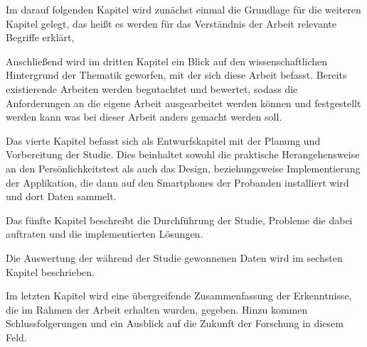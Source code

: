 Im darauf folgenden Kapitel wird zunächst einmal die Grundlage für die weiteren Kapitel gelegt, das heißt
es werden für das Verständnis der Arbeit relevante Begriffe erklärt, 
\par


Anschließend wird im dritten Kapitel ein Blick auf den wissenschaftlichen Hintergrund der Thematik geworfen, mit der sich diese Arbeit befasst.
Bereits existierende Arbeiten werden begutachtet und bewertet, sodass die Anforderungen an die eigene Arbeit ausgearbeitet werden können und festgestellt werden kann was bei dieser Arbeit anders gemacht werden soll.
\par

Das vierte Kapitel befasst sich als Entwurfskapitel mit der Planung und Vorbereitung der Studie.
Dies beinhaltet sowohl die praktische Herangehensweise an den Persönlichkeitstest als auch das Design, beziehungsweise Implementierung der Applikation,
die dann auf den Smartphones der Probanden installiert wird und dort Daten sammelt. 

Das fünfte Kapitel beschreibt die Durchführung der Studie, Probleme die dabei auftraten und die implementierten Lösungen.

Die Auswertung der während der Studie gewonnenen Daten wird im sechsten Kapitel beschrieben.

Im letzten Kapitel wird eine übergreifende Zusammenfassung der Erkenntnisse, die im Rahmen der Arbeit erhalten wurden, gegeben.
Hinzu kommen Schlussfolgerungen und ein Ausblick auf die Zukunft der Forschung in diesem Feld.


